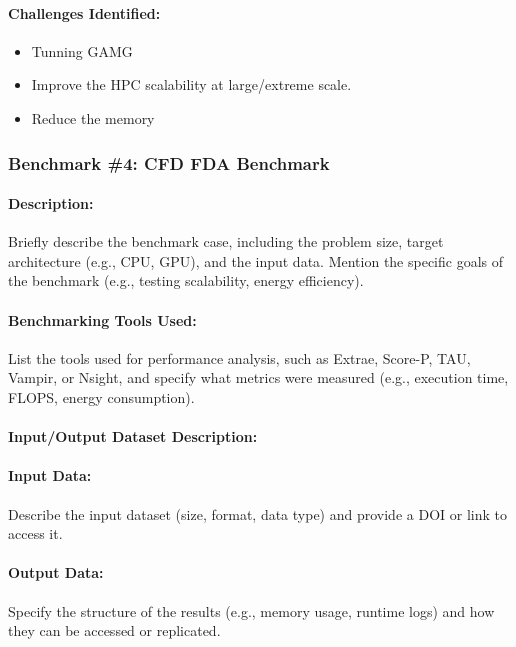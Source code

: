 \paragraph{Challenges Identified:} %


\begin{itemize}
\item Tunning GAMG
\item Improve the HPC scalability at large/extreme scale.
\item Reduce the memory
\end{itemize}


\subsubsection{Benchmark \#4: CFD FDA Benchmark}

\paragraph{Description:} Briefly describe the benchmark case, including the problem size, target architecture (e.g., CPU, GPU), and the input data. Mention the specific goals of the benchmark (e.g., testing scalability, energy efficiency).

\paragraph{Benchmarking Tools Used:} List the tools used for performance analysis, such as Extrae, Score-P, TAU, Vampir, or Nsight, and specify what metrics were measured (e.g., execution time, FLOPS, energy consumption).

\paragraph{Input/Output Dataset Description:}
\paragraph{Input Data:} Describe the input dataset (size, format, data type) and provide a DOI or link to access it.

\paragraph{Output Data:} Specify the structure of the results (e.g., memory usage, runtime logs) and how they can be accessed or replicated.

